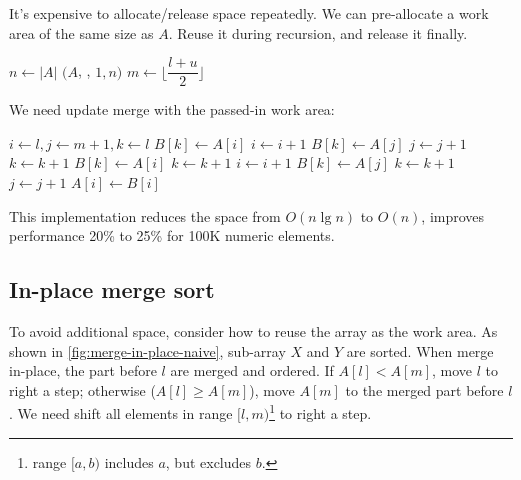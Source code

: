 \documentclass[b5paper]{article}
\begin{document}
It's expensive to allocate/release space repeatedly\cite{Bentley}. We can pre-allocate a work area of the same size as $A$. Reuse it during recursion, and release it finally.

\begin{algorithmic}[1]
  \State $n \gets |A|$
  \State {}$(A$, , $1, n)$
\EndProcedure
\Statex
{}
    \State $m \gets \lfloor \dfrac{l + u}{2} \rfloor$
    \State {}
    \State {}
    \State {}
  \EndIf
\EndProcedure
\end{algorithmic}

We need update merge with the passed-in work area:

\begin{algorithmic}[1]
  \State $i \gets l, j \gets m + 1, k \gets l$
      \State $B[k] \gets A[i]$
      \State $i \gets i + 1$
    \Else
      \State $B[k] \gets A[j]$
      \State $j \gets j + 1$
    \EndIf
    \State $k \gets k + 1$
  \EndWhile
    \State $B[k] \gets A[i]$
    \State $k \gets k + 1$
    \State $i \gets i + 1$
  \EndWhile
    \State $B[k] \gets A[j]$
    \State $k \gets k + 1$
    \State $j \gets j + 1$
  \EndWhile
   
    \State $A[i] \gets B[i]$
  \EndFor
\EndProcedure
\end{algorithmic}

This implementation reduces the space from $O(n \lg n)$ to $O(n)$, improves performance 20\% to 25\% for 100K numeric elements.

\subsection{In-place merge sort}

To avoid additional space, consider how to reuse the array as the work area. As shown in \cref{fig:merge-in-place-naive}, sub-array $X$ and $Y$ are sorted. When merge in-place, the part before $l$ are merged and ordered. If $A[l] < A[m]$, move $l$ to right a step; otherwise ($A[l] \geq A[m]$), move $A[m]$ to the merged part before $l$. We need shift all elements in range $[l, m)$\footnote{range $[a, b)$ includes $a$, but excludes $b$.} to right a step.
\end{document}
